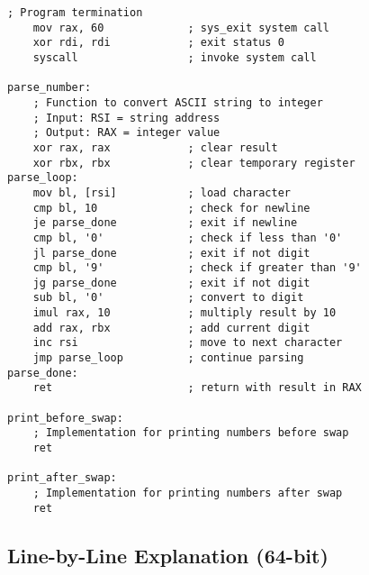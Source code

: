 \documentclass[12pt,a4paper]{article}
\begin{document}
\begin{lstlisting}[caption=64-bit Number Swapping Program]
    ; Program termination
    mov rax, 60             ; sys_exit system call
    xor rdi, rdi            ; exit status 0
    syscall                 ; invoke system call

parse_number:
    ; Function to convert ASCII string to integer
    ; Input: RSI = string address
    ; Output: RAX = integer value
    xor rax, rax            ; clear result
    xor rbx, rbx            ; clear temporary register
parse_loop:
    mov bl, [rsi]           ; load character
    cmp bl, 10              ; check for newline
    je parse_done           ; exit if newline
    cmp bl, '0'             ; check if less than '0'
    jl parse_done           ; exit if not digit
    cmp bl, '9'             ; check if greater than '9'
    jg parse_done           ; exit if not digit
    sub bl, '0'             ; convert to digit
    imul rax, 10            ; multiply result by 10
    add rax, rbx            ; add current digit
    inc rsi                 ; move to next character
    jmp parse_loop          ; continue parsing
parse_done:
    ret                     ; return with result in RAX

print_before_swap:
    ; Implementation for printing numbers before swap
    ret

print_after_swap:
    ; Implementation for printing numbers after swap
    ret
\end{lstlisting}

\subsection{Line-by-Line Explanation (64-bit)}
\end{document}
